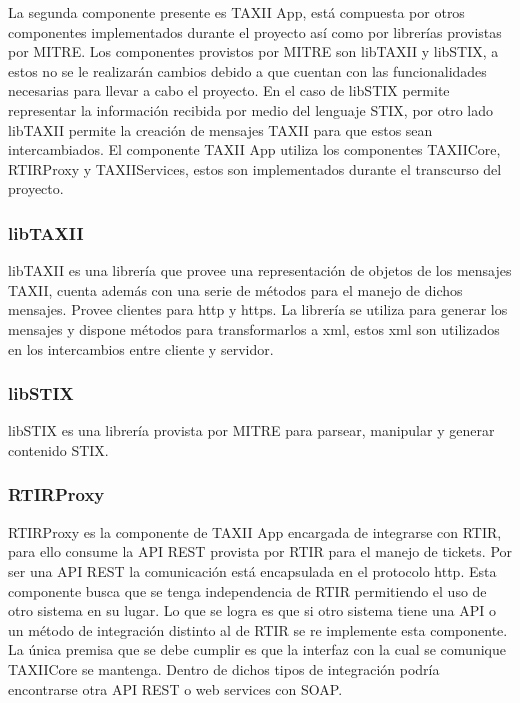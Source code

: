 	\bigskip
	
	La segunda componente presente es TAXII App, está compuesta por otros componentes
		implementados durante el proyecto así como por librerías provistas por MITRE. Los componentes provistos por MITRE son
		libTAXII y libSTIX, a estos no se le realizarán cambios debido a que cuentan con las funcionalidades necesarias para
		llevar a cabo el proyecto. En el caso de libSTIX permite representar la información recibida por medio del lenguaje
		STIX, por otro lado libTAXII permite la creación de mensajes TAXII para que estos sean intercambiados. El componente
		TAXII App utiliza los componentes TAXIICore, RTIRProxy y TAXIIServices, estos son implementados durante el transcurso
		del proyecto.
	
	\subsubsection{libTAXII}
	libTAXII \cite{libtaxii} es una librería que provee una representación de objetos de los mensajes TAXII, cuenta además
		con una serie de métodos para el manejo de dichos mensajes. Provee clientes para http y https. La librería se utiliza
		para generar los mensajes y dispone métodos para transformarlos a xml, estos xml son utilizados en los intercambios
		entre cliente y servidor.
	
	\subsubsection{libSTIX}
	libSTIX \cite{pythonstixgit} es una librería provista por MITRE para parsear, manipular y generar contenido STIX.
	
	\subsubsection{RTIRProxy}
	RTIRProxy es la componente de TAXII App encargada de integrarse con RTIR, para ello consume la
		API REST provista por RTIR para el manejo de tickets. Por ser una API REST la comunicación está encapsulada en el
		protocolo http. Esta componente busca que se tenga independencia de RTIR permitiendo el uso de otro sistema en su
		lugar. Lo que se logra es que si otro sistema tiene una API
		o un método de integración distinto al de RTIR se re implemente esta componente. La única premisa que se debe cumplir
		es que la interfaz con la cual se comunique TAXIICore se mantenga. Dentro de dichos tipos de integración podría
		encontrarse otra API REST o web services con SOAP.
	

